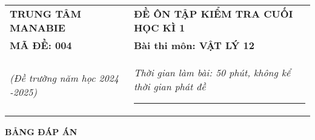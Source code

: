 \begin{tabular}{M{6.5cm}M{11cm}}
	\textbf{TRUNG TÂM MANABIE}& \textbf{ĐỀ ÔN TẬP KIỂM TRA CUỐI HỌC KÌ 1}\\
	\textbf{MÃ ĐỀ: 004}& \textbf{Bài thi môn: VẬT LÝ 12}\\
	\textit{(Đề trường  năm học 2024 -2025)}& \textit{Thời gian làm bài: 50 phút, không kể thời gian phát đề}
	
	\noindent\rule{4cm}{0.8pt} \\
\end{tabular}
\setcounter{section}{0}
\begin{center}
	\textbf{\large BẢNG ĐÁP ÁN}
\end{center}
\section{}
\section{}
\section{}



